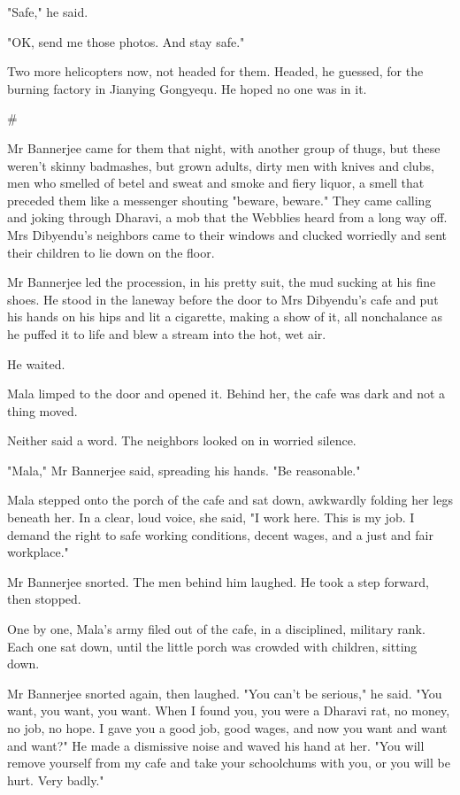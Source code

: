 "Safe," he said.

"OK, send me those photos. And stay safe."

Two more helicopters now, not headed for them. Headed, he guessed,
for the burning factory in Jianying Gongyequ. He hoped no one was
in it.

\#

Mr Bannerjee came for them that night, with another group of thugs,
but these weren't skinny badmashes, but grown adults, dirty men
with knives and clubs, men who smelled of betel and sweat and smoke
and fiery liquor, a smell that preceded them like a messenger
shouting "beware, beware." They came calling and joking through
Dharavi, a mob that the Webblies heard from a long way off. Mrs
Dibyendu's neighbors came to their windows and clucked worriedly
and sent their children to lie down on the floor.

Mr Bannerjee led the procession, in his pretty suit, the mud
sucking at his fine shoes. He stood in the laneway before the door
to Mrs Dibyendu's cafe and put his hands on his hips and lit a
cigarette, making a show of it, all nonchalance as he puffed it to
life and blew a stream into the hot, wet air.

He waited.

Mala limped to the door and opened it. Behind her, the cafe was
dark and not a thing moved.

Neither said a word. The neighbors looked on in worried silence.

"Mala," Mr Bannerjee said, spreading his hands. "Be reasonable."

Mala stepped onto the porch of the cafe and sat down, awkwardly
folding her legs beneath her. In a clear, loud voice, she said, "I
work here. This is my job. I demand the right to safe working
conditions, decent wages, and a just and fair workplace."

Mr Bannerjee snorted. The men behind him laughed. He took a step
forward, then stopped.

One by one, Mala's army filed out of the cafe, in a disciplined,
military rank. Each one sat down, until the little porch was
crowded with children, sitting down.

Mr Bannerjee snorted again, then laughed. "You can't be serious,"
he said. "You want, you want, you want. When I found you, you were
a Dharavi rat, no money, no job, no hope. I gave you a good job,
good wages, and now you want and want and want?" He made a
dismissive noise and waved his hand at her. "You will remove
yourself from my cafe and take your schoolchums with you, or you
will be hurt. Very badly."

